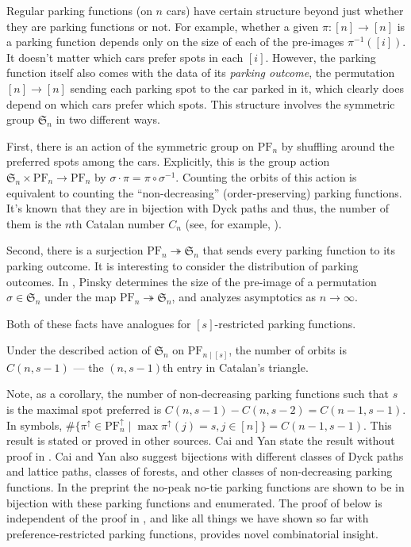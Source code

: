 \documentclass[12pt]{article}
\begin{document}
Regular parking functions (on $n$ cars) have certain structure beyond just whether they are parking functions or not. For example, whether a given $\pi : [n] \to [n]$ is a parking function depends only on the size of each of the pre-images $\pi^{-1}([i])$. It doesn't matter which cars prefer spots in each $[i]$. However, the parking function itself also comes with the data of its \emph{parking outcome}, the permutation $[n] \to [n]$ sending each parking spot to the car parked in it, which clearly does depend on which cars prefer which spots. This structure involves the symmetric group $\mathfrak{S}_{n}$ in two different ways.

First, there is an action of the symmetric group on $\mathrm{PF}_{n}$ by shuffling around the preferred spots among the cars. Explicitly, this is the group action $\mathfrak{S}_{n} \times \mathrm{PF}_{n} \to \mathrm{PF}_{n}$ by $\sigma \cdot \pi = \pi \circ \sigma^{-1}$. Counting the orbits of this action is equivalent to counting the ``non-decreasing'' (order-preserving) parking functions. It's known that they are in bijection with Dyck paths and thus, the number of them is the $n$th Catalan number $C_{n}$ (see, for example, \cite{armstrong-loehr-warrington-2016}).

Second, there is a surjection $\mathrm{PF}_{n} \twoheadrightarrow \mathfrak{S}_{n}$ that sends every parking function to its parking outcome. It is interesting to consider the distribution of parking outcomes. In \cite{pinsky-2024}, Pinsky determines the size of the pre-image of a permutation $\sigma \in \mathfrak{S}_{n}$ under the map $\mathrm{PF}_{n} \twoheadrightarrow \mathfrak{S}_{n}$, and analyzes asymptotics as $n \to \infty$.

Both of these facts have analogues for $[s]$-restricted parking functions. 

\begin{theorem}
	Under the described action of $\mathfrak{S}_{n}$ on $\mathrm{PF}_{n \mid [s]}$, the number of orbits is $C(n, s - 1)$ --- the $(n, s - 1)$th entry in Catalan's triangle. \cite[A009766]{oeis}
\end{theorem} 

Note, as a corollary, the number of non-decreasing parking functions such that $s$ is the maximal spot preferred is $C(n, s - 1) - C(n, s - 2) = C(n - 1, s - 1)$. In symbols, $\# \{ \pi^{\uparrow} \in \mathrm{PF}^{\uparrow}_{n} \mid \max \pi^{\uparrow}(j) = s, j \in [n] \} = C(n - 1, s - 1)$. This result is stated or proved in other sources. Cai and Yan state the result without proof in \cite{cai-yan-2019}. Cai and Yan also suggest bijections with different classes of Dyck paths and lattice paths, classes of forests, and other classes of non-decreasing parking functions. In the preprint \cite{cruz-harris-et-al-2024} the no-peak no-tie parking functions are shown to be in bijection with these parking functions and enumerated. The proof of below is independent of the proof in \cite{cruz-harris-et-al-2024}, and like all things we have shown so far with preference-restricted parking functions, provides novel combinatorial insight.
\end{document}
